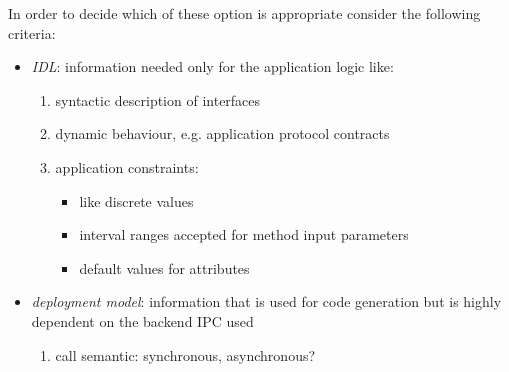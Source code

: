\documentclass[a4paper,10pt]{scrreprt}
\newlength{\XdocItemIndent}
\begin{document}
In order to decide which of these option is appropriate consider the following criteria:
\setlength{\XdocItemIndent}{\textwidth}
\begin{itemize}
\addtolength{\XdocItemIndent}{-2.5em}
\item \begin{minipage}[t]{\XdocItemIndent}
\textit{IDL}: information needed only for the application logic like:
		\setlength{\XdocItemIndent}{\textwidth}
\begin{enumerate}
\addtolength{\XdocItemIndent}{-2.5em}
\item \begin{minipage}[t]{\XdocItemIndent}
syntactic description of interfaces

\end{minipage}
\item \begin{minipage}[t]{\XdocItemIndent}
dynamic behaviour, e.g. application protocol contracts

\end{minipage}
\item \begin{minipage}[t]{\XdocItemIndent}
application constraints:
				\setlength{\XdocItemIndent}{\textwidth}
\begin{itemize}
\addtolength{\XdocItemIndent}{-2.5em}
\item \begin{minipage}[t]{\XdocItemIndent}
like discrete values

\end{minipage}
\item \begin{minipage}[t]{\XdocItemIndent}
interval ranges accepted for method input parameters

\end{minipage}
\item \begin{minipage}[t]{\XdocItemIndent}
default values for attributes

\end{minipage}
\end{itemize}
\addtolength{\XdocItemIndent}{2.5em}


\end{minipage}
\end{enumerate}
\addtolength{\XdocItemIndent}{2.5em}


\end{minipage}
\item \begin{minipage}[t]{\XdocItemIndent}
\textit{deployment model}: information that is used for code generation but is
		highly dependent on the backend IPC used
		\setlength{\XdocItemIndent}{\textwidth}
\begin{enumerate}
\addtolength{\XdocItemIndent}{-2.5em}
\item \begin{minipage}[t]{\XdocItemIndent}
call semantic: synchronous, asynchronous?


\end{minipage}
\end{enumerate}
\end{minipage}
\end{itemize}
\end{document}
